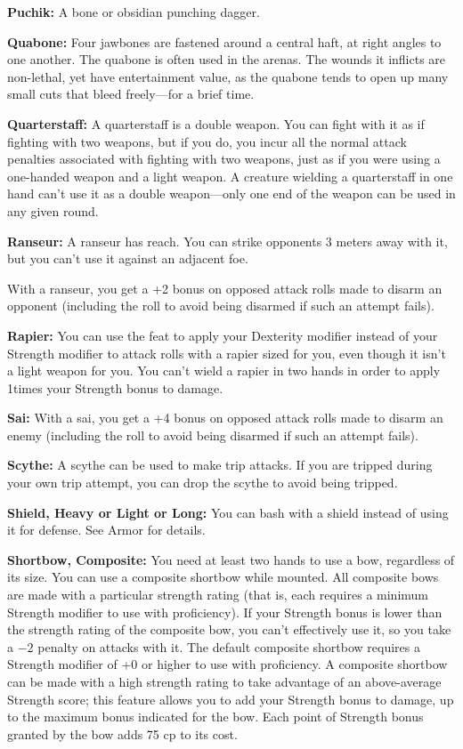 \textbf{Puchik:} A bone or obsidian punching dagger.

\textbf{Quabone:} Four jawbones are fastened around a central haft, at right angles to one another. The quabone is often used in the arenas. The wounds it inflicts are non-lethal, yet have entertainment value, as the quabone tends to open up many small cuts that bleed freely---for a brief time.

\textbf{Quarterstaff:} A quarterstaff is a double weapon. You can fight with it as if fighting with two weapons, but if you do, you incur all the normal attack penalties associated with fighting with two weapons, just as if you were using a one-handed weapon and a light weapon. A creature wielding a quarterstaff in one hand can't use it as a double weapon---only one end of the weapon can be used in any given round. 

\textbf{Ranseur:} A ranseur has reach. You can strike opponents 3 meters away with it, but you can't use it against an adjacent foe.

With a ranseur, you get a +2 bonus on opposed attack rolls made to disarm an opponent (including the roll to avoid being disarmed if such an attempt fails). 

\textbf{Rapier:} You can use the  feat to apply your Dexterity modifier instead of your Strength modifier to attack rolls with a rapier sized for you, even though it isn't a light weapon for you. You can't wield a rapier in two hands in order to apply 1\onehalf times your Strength bonus to damage. 

\textbf{Sai:} With a sai, you get a +4 bonus on opposed attack rolls made to disarm an enemy (including the roll to avoid being disarmed if such an attempt fails). 

\textbf{Scythe:} A scythe can be used to make trip attacks. If you are tripped during your own trip attempt, you can drop the scythe to avoid being tripped. 

\textbf{Shield, Heavy or Light or Long:} You can bash with a shield instead of using it for defense. See Armor for details. 

\textbf{Shortbow, Composite:} You need at least two hands to use a bow, regardless of its size. You can use a composite shortbow while mounted. All composite bows are made with a particular strength rating (that is, each requires a minimum Strength modifier to use with proficiency). If your Strength bonus is lower than the strength rating of the composite bow, you can't effectively use it, so you take a $-2$ penalty on attacks with it. The default composite shortbow requires a Strength modifier of +0 or higher to use with proficiency. A composite shortbow can be made with a high strength rating to take advantage of an above-average Strength score; this feature allows you to add your Strength bonus to damage, up to the maximum bonus indicated for the bow. Each point of Strength bonus granted by the bow adds 75 cp to its cost.

